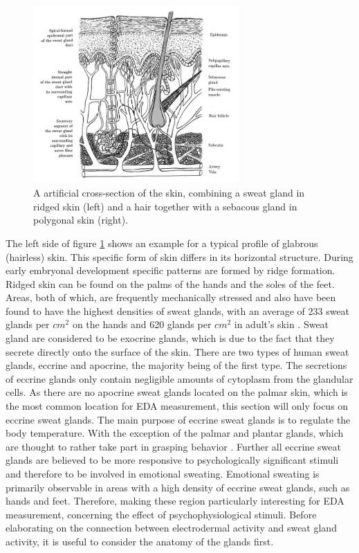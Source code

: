 \begin{figure}[ht]
\centering
\includegraphics[width=0.7\textwidth]{images/skinDermis.png}
\caption{A artificial cross-section of the skin, combining a sweat gland in ridged skin (left) and a hair together with a sebacous gland in polygonal skin (right).}
\label{DermisImg}
\end{figure} 

The left side of figure \ref{DermisImg} shows an example for a typical profile of glabrous (hairless) skin. This specific form of skin differs in its horizontal structure. During early embryonal development specific patterns are formed by ridge formation. Ridged skin can be found on the palms of the hands and the soles of the feet. Areas, both of which, are frequently mechanically stressed and also have been found to have the highest densities of sweat glands, with an average of 233 sweat glands per $cm^{2}$ on the hands and 620 glands per $cm^{2}$ in adult's skin \citep{boucsein2013electrodermal}. Sweat gland are considered to be exocrine glands, which is due to the fact that they secrete directly onto the surface of the skin. There are two types of human sweat glands, eccrine and apocrine, the majority being of the first type. The secretions of eccrine glands only contain negligible amounts of cytoplasm from the glandular cells. As there are no apocrine sweat glands located on the palmar skin, which is the most common location for EDA measurement, this section will only focus on eccrine sweat glands. The main purpose of eccrine sweat glands is to regulate the body temperature. With the exception of the palmar and plantar glands, which are thought to rather take part in grasping behavior \cite{HANDBOOKPP}. Further all eccrine sweat glands are believed to be more responsive to psychologically significant stimuli and therefore to be involved in emotional sweating. Emotional sweating is primarily observable in areas with a high density of eccrine sweat glands, such as hands and feet. Therefore, making these region particularly interesting for EDA measurement, concerning the effect of psychophysiological stimuli. Before elaborating on the connection between electrodermal activity and sweat gland activity, it is useful to consider the anatomy of the glands first.

